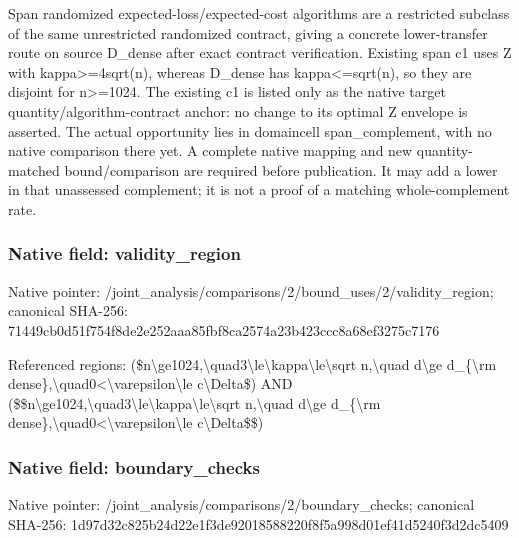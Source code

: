 \documentclass[10pt,a4paper]{article}
\begin{document}
\begingroup\raggedright\sloppy Span randomized expected-loss/\allowbreak{}expected-cost algorithms are a restricted subclass of the same unrestricted randomized contract,\allowbreak{} giving a concrete lower-transfer route on source D\_\allowbreak{}dense after exact contract verification. Existing span c1 uses Z with kappa>=\allowbreak{}4sqrt(n),\allowbreak{} whereas D\_\allowbreak{}dense has kappa<=\allowbreak{}sqrt(n),\allowbreak{} so they are disjoint for n>=\allowbreak{}1024. The existing c1 is listed only as the native target quantity/\allowbreak{}algorithm-contract anchor:\allowbreak{} no change to its optimal Z envelope is asserted. The actual opportunity lies in domaincell span\_\allowbreak{}complement,\allowbreak{} with no native comparison there yet. A complete native mapping and new quantity-matched bound/\allowbreak{}comparison are required before publication. It may add a lower in that unassessed complement;\allowbreak{} it is not a proof of a matching whole-complement rate.\par\endgroup

\subsubsection{Native field: validity\_\allowbreak{}region}
Native pointer: /joint\_\allowbreak{}analysis/comparisons/2/bound\_\allowbreak{}uses/2/validity\_\allowbreak{}region; canonical SHA-256: 71449cb0d51f754f8de2e252aaa85fbf8ca2574a23b423ccc8a68ef3275c7176

\begingroup\raggedright\sloppy Referenced regions:\allowbreak{} (\$n\textbackslash{}ge1024,\allowbreak{}\textbackslash{}quad3\textbackslash{}le\textbackslash{}kappa\textbackslash{}le\textbackslash{}sqrt n,\allowbreak{}\textbackslash{}quad d\textbackslash{}ge d\_\allowbreak{}\{\textbackslash{}rm dense\},\allowbreak{}\textbackslash{}quad0<\textbackslash{}varepsilon\textbackslash{}le c\textbackslash{}Delta\$) AND (\$\$n\textbackslash{}ge1024,\allowbreak{}\textbackslash{}quad3\textbackslash{}le\textbackslash{}kappa\textbackslash{}le\textbackslash{}sqrt n,\allowbreak{}\textbackslash{}quad d\textbackslash{}ge d\_\allowbreak{}\{\textbackslash{}rm dense\},\allowbreak{}\textbackslash{}quad0<\textbackslash{}varepsilon\textbackslash{}le c\textbackslash{}Delta\$\$)\par\endgroup

\subsubsection{Native field: boundary\_\allowbreak{}checks}
Native pointer: /joint\_\allowbreak{}analysis/comparisons/2/boundary\_\allowbreak{}checks; canonical SHA-256: 1d97d32c825b24d22e1f3de92018588220f8f5a998d01ef41d5240f3d2dc5409
\end{document}
